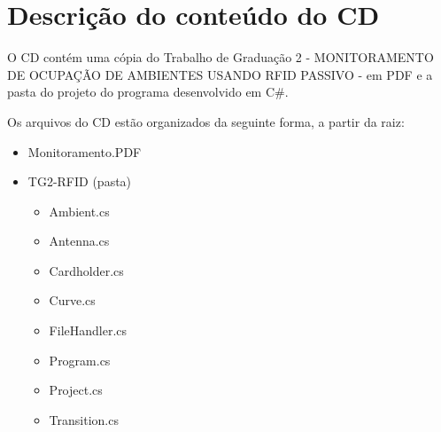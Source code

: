 
\chapter{Descrição do conteúdo do CD}

\label{AnCD}

O CD contém uma cópia do Trabalho de Graduação 2 - MONITORAMENTO DE OCUPAÇÃO DE AMBIENTES USANDO RFID PASSIVO - em PDF e a pasta do projeto do programa desenvolvido em C\#.

Os arquivos do CD estão organizados da seguinte forma, a partir da raiz:

\begin{itemize}
    \item Monitoramento.PDF
    \item TG2-RFID (pasta)
    \begin{itemize}
        \item Ambient.cs
        \item Antenna.cs
        \item Cardholder.cs
        \item Curve.cs
        \item FileHandler.cs
        \item Program.cs
        \item Project.cs
        \item Transition.cs
    \end{itemize}
\end{itemize}
